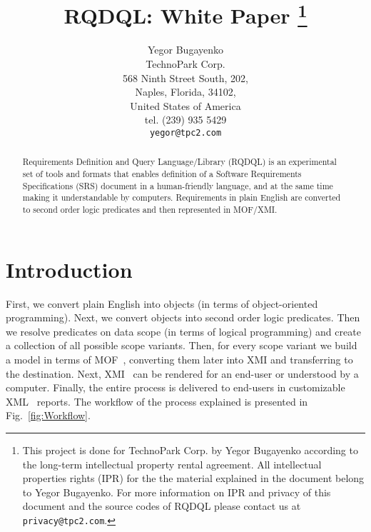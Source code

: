 \documentclass{article}
\begin{document}
\setlength{\parindent}{0pt}
\setlength{\parskip}{1em}
\newcommand{\type}[1]{\mbox{\texttt{#1}}}
\newenvironment{maths}
{
    \vspace*{0.5em}
    \begin{tabular}{l>{\raggedright\arraybackslash}p{20em}}
}
{
    \end{tabular}
    \vspace*{1em}
}

\title{RQDQL: White Paper
    \footnote{
        This project is done for TechnoPark Corp. by Yegor Bugayenko
        according to the long-term intellectual property rental
        agreement. All intellectual properties rights (IPR) for the the material
        explained in the document belong to Yegor Bugayenko.
        For more information on IPR and privacy of this document and
        the source codes of RQDQL please contact us at \texttt{privacy@tpc2.com}.
    }
}
\author{
    Yegor Bugayenko \\
    TechnoPark Corp. \\
    568 Ninth Street South, 202, \\
    Naples, Florida, 34102, \\
    United States of America \\
    tel. (239) 935 5429 \\
    \texttt{yegor@tpc2.com}
}
\maketitle
\begin{abstract}
    Requirements Definition and Query Language/Library (RQDQL) is
    an experimental set of tools and formats that enables definition of
    a Software Requirements Specifications (SRS) document in a 
    human-friendly language, and at the same time making it understandable
    by computers. Requirements in plain English are converted to 
    second order logic predicates and then represented in MOF/XMI.
\end{abstract}

\section{Introduction}

    First, we convert plain English into objects (in terms of object-oriented
    programming). Next, we convert objects into second order logic predicates.
    Then we resolve predicates on data scope (in terms of logical programming)
    and create a collection of all possible scope variants. Then, for every
    scope variant we build a model in terms of MOF~\cite{mof2}, converting them later
    into XMI and transferring to the destination. Next, XMI~\cite{mof-to-xmi} can be rendered
    for an end-user or understood by a computer. Finally, the entire process
    is delivered to end-users in customizable XML~\cite{xml} reports.
    The workflow of the process explained is presented in Fig.~\ref{fig:Workflow}.
    
\end{document}
